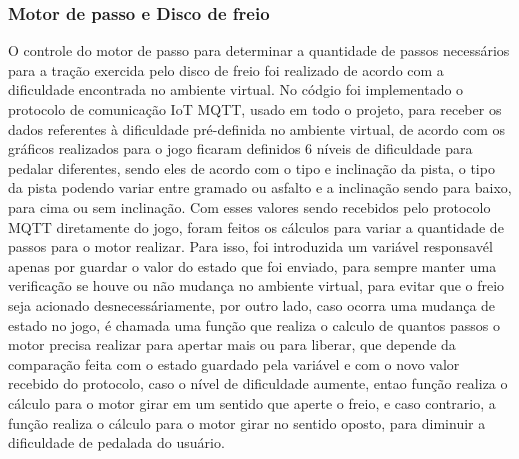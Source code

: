     \subsubsection{Motor de passo e Disco de freio}

	O controle do motor de passo para determinar a quantidade de passos necessários para a tração exercida pelo disco de freio foi realizado  de acordo com a dificuldade encontrada no ambiente virtual. No códgio foi implementado o protocolo de comunicação IoT MQTT, usado em todo o projeto, para receber os dados referentes à dificuldade pré-definida no ambiente virtual, de acordo com os gráficos realizados para o jogo ficaram definidos 6 níveis de dificuldade para pedalar diferentes, sendo eles de acordo com o tipo e inclinação da pista, o tipo da pista podendo variar entre gramado ou asfalto e a inclinação sendo para baixo, para cima ou sem inclinação. Com esses  valores sendo recebidos pelo protocolo MQTT diretamente do jogo, foram feitos os cálculos para variar a quantidade de passos para o motor realizar. Para isso, foi introduzida um variável responsavél apenas por guardar o valor do estado que foi enviado, para sempre manter uma verificação se houve ou não mudança no ambiente virtual, para evitar que o freio seja acionado desnecessáriamente, por outro lado, caso ocorra uma mudança de estado no jogo, é chamada uma função que realiza o calculo de quantos passos o motor precisa realizar para apertar mais ou para liberar, que depende da comparação feita com o estado guardado pela variável e com o novo valor recebido do protocolo, caso o nível de dificuldade aumente, entao função realiza o cálculo para o motor girar em um sentido que aperte o freio, e caso contrario, a função realiza o cálculo para o motor girar no sentido oposto, para diminuir a dificuldade de pedalada do usuário.


